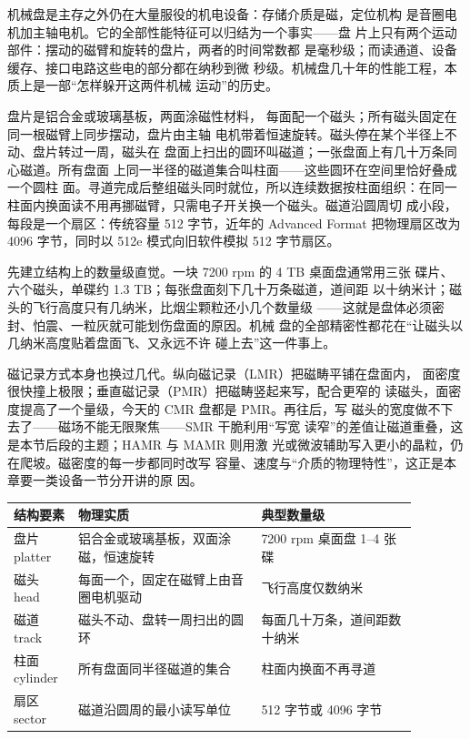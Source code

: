 机械盘是主存之外仍在大量服役的机电设备：存储介质是磁，定位机构
是音圈电机加主轴电机。它的全部性能特征可以归结为一个事实——盘
片上只有两个运动部件：摆动的磁臂和旋转的盘片，两者的时间常数都
是毫秒级；而读通道、设备缓存、接口电路这些电的部分都在纳秒到微
秒级。机械盘几十年的性能工程，本质上是一部“怎样躲开这两件机械
运动”的历史。

盘片是铝合金或玻璃基板，两面涂磁性材料，
每面配一个磁头；所有磁头固定在同一根磁臂上同步摆动，盘片由主轴
电机带着恒速旋转。磁头停在某个半径上不动、盘片转过一周，磁头在
盘面上扫出的圆环叫磁道；一张盘面上有几十万条同心磁道。所有盘面
上同一半径的磁道集合叫柱面——这些圆环在空间里恰好叠成一个圆柱
面。寻道完成后整组磁头同时就位，所以连续数据按柱面组织：在同一
柱面内换面读不用再挪磁臂，只需电子开关换一个磁头。磁道沿圆周切
成小段，每段是一个扇区：传统容量 512 字节，近年的 Advanced
Format 把物理扇区改为 4096 字节，同时以 512e 模式向旧软件模拟
512 字节扇区。

先建立结构上的数量级直觉。一块 7200 rpm 的 4 TB 桌面盘通常用三张
碟片、六个磁头，单碟约 1.3 TB；每张盘面刻下几十万条磁道，道间距
以十纳米计；磁头的飞行高度只有几纳米，比烟尘颗粒还小几个数量级
——这就是盘体必须密封、怕震、一粒灰就可能划伤盘面的原因。机械
盘的全部精密性都花在“让磁头以几纳米高度贴着盘面飞、又永远不许
碰上去”这一件事上。

磁记录方式本身也换过几代。纵向磁记录（LMR）把磁畴平铺在盘面内，
面密度很快撞上极限；垂直磁记录（PMR）把磁畴竖起来写，配合更窄的
读磁头，面密度提高了一个量级，今天的 CMR 盘都是 PMR。再往后，写
磁头的宽度做不下去了——磁场不能无限聚焦——SMR 干脆利用“写宽
读窄”的差值让磁道重叠，这是本节后段的主题；HAMR 与 MAMR 则用激
光或微波辅助写入更小的晶粒，仍在爬坡。磁密度的每一步都同时改写
容量、速度与“介质的物理特性”，这正是本章要一类设备一节分开讲的原
因。

\begin{longtable}{L{0.14\linewidth}L{0.40\linewidth}L{0.34\linewidth}}
\toprule
结构要素 & 物理实质 & 典型数量级 \\
\midrule
盘片 platter & 铝合金或玻璃基板，双面涂磁，恒速旋转 & 7200 rpm 桌面盘 1--4 张碟 \\\tablerowrule
磁头 head & 每面一个，固定在磁臂上由音圈电机驱动 & 飞行高度仅数纳米 \\\tablerowrule
磁道 track & 磁头不动、盘转一周扫出的圆环 & 每面几十万条，道间距数十纳米 \\\tablerowrule
柱面 cylinder & 所有盘面同半径磁道的集合 & 柱面内换面不再寻道 \\\tablerowrule
扇区 sector & 磁道沿圆周的最小读写单位 & 512 字节或 4096 字节 \\
\bottomrule
\end{longtable}

